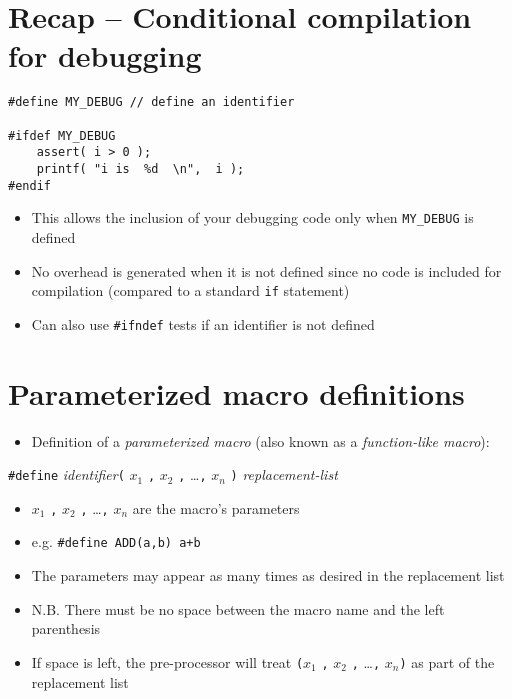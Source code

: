 \documentclass{article}
\begin{document}
\section{Recap -- Conditional compilation for debugging}
\begin{Verbatim}
#define MY_DEBUG // define an identifier

#ifdef MY_DEBUG
	assert( i > 0 );
	printf( "i is  %d  \n",  i );
#endif
\end{Verbatim}

\begin{itemize}
\item This allows the inclusion of your debugging code only when \verb!MY_DEBUG! is defined
\item No overhead is generated when it is not defined since no code is included for compilation (compared to a standard \verb!if! statement)
\item Can also use \verb!#ifndef! tests if an identifier is not defined
\end{itemize}




\section{Parameterized macro definitions}
\begin{itemize}
\item Definition of a \emph{parameterized macro} (also known as a \emph{function-like macro}):
\end{itemize}
\verb!#define! \emph{identifier}\verb!(! $x_1$ \verb!,! $x_2$ \verb!,! \ldots \verb!,! $x_n$ \verb!)! \emph{replacement-list}
\begin{itemize}
\item $x_1$ \verb!,! $x_2$ \verb!,! \ldots \verb!,! $x_n$ are the macro's parameters
\item e.g. \verb!#define ADD(a,b) a+b!
\item The parameters may appear as many times as desired in the replacement list
\item N.B. There must be no space between the macro name and the left parenthesis
\item If space is left, the pre-processor will treat \verb!(!$x_1$ \verb!,! $x_2$ \verb!,! \ldots \verb!,! $x_n$\verb!)!  as part of the replacement list
\end{itemize}
\end{document}
